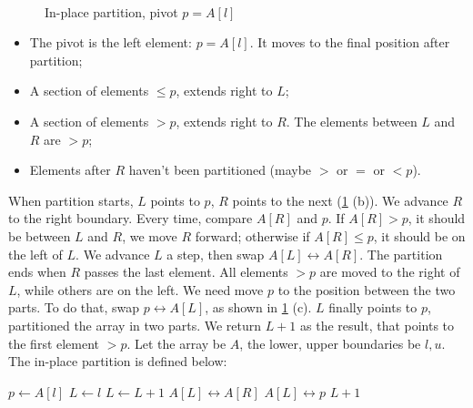 \documentclass[b5paper]{article}
\begin{document}
\begin{figure}[htbp]
{} \\
   \caption{In-place partition, pivot $p = A[l]$}
   \label{fig:partition-1-way}
\end{figure}

\begin{itemize}
\item The pivot is the left element: $p = A[l]$. It moves to the final position after partition;
\item A section of elements $\leq p$, extends right to $L$;
\item A section of elements $> p$, extends right to $R$. The elements between $L$ and $R$ are $> p$;
\item Elements after $R$ haven't been partitioned (maybe $>$ or $=$ or $< p$).
\end{itemize}

When partition starts, $L$ points to $p$, $R$ points to the next (\cref{fig:partition-1-way} (b)). We advance $R$ to the right boundary. Every time, compare $A[R]$ and $p$. If $A[R] > p$, it should be between $L$ and $R$, we move $R$ forward; otherwise if $A[R] \leq p$, it should be on the left of $L$. We advance $L$ a step, then swap $A[L] \leftrightarrow A[R]$. The partition ends when $R$ passes the last element. All elements $> p$ are moved to the right of $L$, while others are on the left. We need move $p$ to the position between the two parts. To do that, swap $p \leftrightarrow A[L]$, as shown in \cref{fig:partition-1-way} (c). $L$ finally points to $p$, partitioned the array in two parts. We return $L + 1$ as the result, that points to the first element $> p$. Let the array be $A$, the lower, upper boundaries be $l, u$. The in-place partition is defined below:

\begin{algorithmic}[1]
  \State $p \gets A[l]$  
  \State $L \gets l$ 
   
      \State $L \gets L + 1$
      \State {} $A[L] \leftrightarrow A[R]$
    \EndIf
  \EndFor
  \State {} $A[L] \leftrightarrow p$
  \State \Return $L + 1$ 
\EndFunction
\end{algorithmic}
\end{document}
